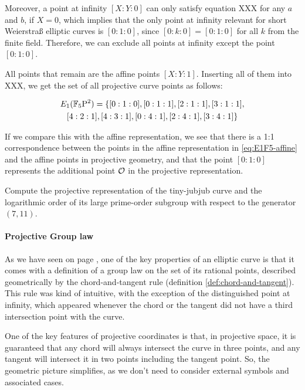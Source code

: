 \begin{example}
Moreover, a point at infinity $[X:Y:0]$ can only satisfy equation XXX for any $a$ and $b$, if $X=0$, which implies that the only point at infinity relevant for short Weierstraß elliptic curves is $[0:1:0]$, since $[0:k:0]= [0:1:0]$ for all $k$ from the finite field. Therefore, we can exclude all points at infinity except the point $[0:1:0]$.

All points that remain are the affine points $[X:Y:1]$. Inserting all of them into XXX, we get the set of all projective curve points as follows:

\begin{multline*}
E_1(\mathbb{F}_5\mathrm{P}^2)=\{[0:1:0], [0:1:1], [2:1:1], [3:1:1], \\ [4:2:1], [4:3:1], [0:4:1], [2:4:1], [3:4:1]\}
\end{multline*}

If we compare this with the affine representation, we see that there is a 1:1 correspondence between the points in the affine representation in \ref{eq:E1F5-affine} and the affine points in projective geometry, and that the point $[0:1:0]$ represents the additional point $\mathcal{O}$ in the projective representation.
\end{example} 

\begin{exercise}
Compute the projective representation of the tiny-jubjub curve and the logarithmic order of its large prime-order subgroup with respect to the generator $(7,11)$.
\end{exercise}

\paragraph{Projective Group law}
As we have seen on page \pageref{chap:elliptic-curves}, one of the key properties of an elliptic curve is that it comes with a definition of a group law on the set of its rational points, described geometrically by the chord-and-tangent rule (definition \ref{def:chord-and-tangent}). This rule was kind of intuitive, with the exception of the distinguished point at infinity, which appeared whenever the chord or the tangent did not have a third intersection point with the curve.

One of the key features of projective coordinates is that, in projective space, it is guaranteed that any chord will always intersect the curve in three points, and any tangent will intersect it in two points including the tangent point. So, the geometric picture simplifies, as we don't need to consider external symbols and associated cases.

